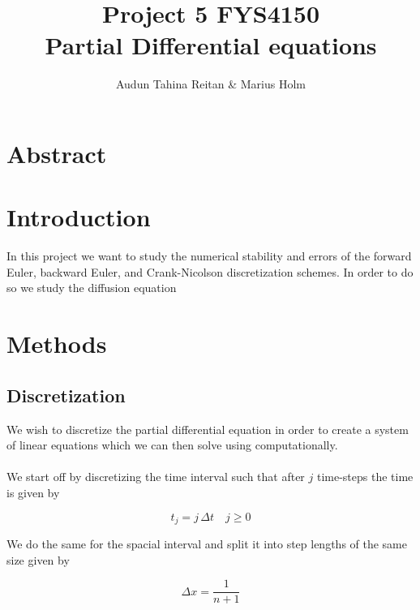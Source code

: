 \documentclass[a4paper, fontsize=11pt]{article}
\begin{document}
\title{Project 5 FYS4150 \\ Partial Differential equations}
\author{Audun Tahina Reitan \& Marius Holm}

\maketitle


\section{Abstract}


\section{Introduction}

In this project we want to study the numerical stability and errors of the forward Euler, backward Euler, and Crank-Nicolson discretization schemes. In order to do so we study the diffusion equation 


\section{Methods}


\subsection{Discretization}

We wish to discretize the partial differential equation in order to create a system of linear equations which we can then solve using computationally. 

\paragraph{}
We start off by discretizing the time interval such that after $j$ time-steps the time is given by 

\begin{equation}
t_{j} = j \, \Delta t \quad j \geq 0
\end{equation}

We do the same for the spacial interval and split it into step lengths of the same size given by 

\begin{equation}
\Delta x = \dfrac{1}{n+1}
\end{equation}
\end{document}
